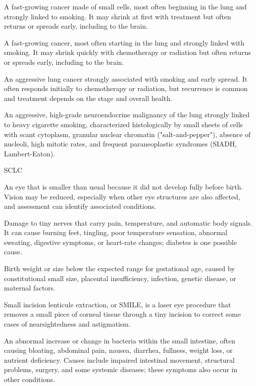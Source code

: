  A fast-growing cancer made of small cells, most often beginning in the lung and strongly linked to smoking. It may shrink at first with treatment but often returns or spreads early, including to the brain.

 A fast-growing cancer, most often starting in the lung and strongly linked with smoking. It may shrink quickly with chemotherapy or radiation but often returns or spreads early, including to the brain.

 An aggressive lung cancer strongly associated with smoking and early spread. It often responds initially to chemotherapy or radiation, but recurrence is common and treatment depends on the stage and overall health.

 An aggressive, high-grade neuroendocrine malignancy of the lung strongly linked to heavy cigarette smoking, characterized histologically by small sheets of cells with scant cytoplasm, granular nuclear chromatin ("salt-and-pepper"), absence of nucleoli, high mitotic rates, and frequent paraneoplastic syndromes (SIADH, Lambert-Eaton).

\synonyms
SCLC

 An eye that is smaller than usual because it did not develop fully before birth. Vision may be reduced, especially when other eye structures are also affected, and assessment can identify associated conditions.

 Damage to tiny nerves that carry pain, temperature, and automatic body signals. It can cause burning feet, tingling, poor temperature sensation, abnormal sweating, digestive symptoms, or heart-rate changes; diabetes is one possible cause.

 Birth weight or size below the expected range for gestational age, caused by constitutional small size, placental insufficiency, infection, genetic disease, or maternal factors.

 Small incision lenticule extraction, or SMILE, is a laser eye procedure that removes a small piece of corneal tissue through a tiny incision to correct some cases of nearsightedness and astigmatism.

 An abnormal increase or change in bacteria within the small intestine, often causing bloating, abdominal
pain, nausea, diarrhea, fullness, weight loss, or nutrient deficiency. Causes include impaired intestinal movement,
structural problems, surgery, and some systemic diseases; these symptoms also occur in other conditions.

